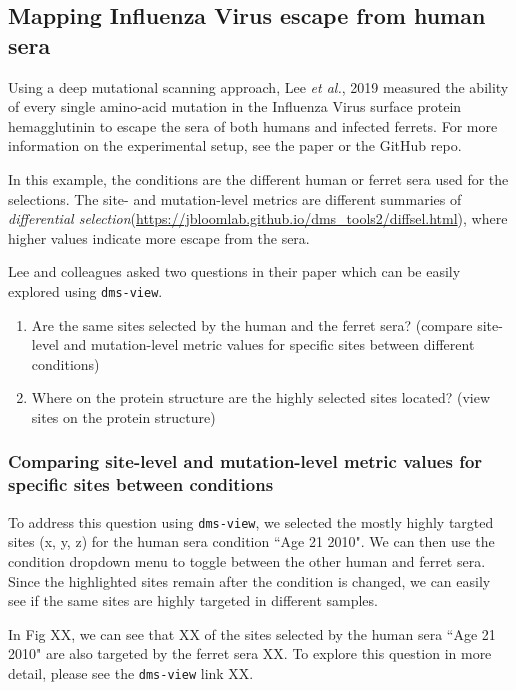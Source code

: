 \subsection{Mapping Influenza Virus escape from human sera}

Using a deep mutational scanning approach, Lee \textit{et al.}, 2019 measured the ability of every single amino-acid mutation in the Influenza Virus surface protein hemagglutinin to escape the sera of both humans and infected ferrets.
For more information on the experimental setup, see the paper or the GitHub repo.

In this example, the conditions are the different human or ferret sera used for the selections.
The site- and mutation-level metrics are different summaries of \textit{differential selection}(\url{https://jbloomlab.github.io/dms_tools2/diffsel.html}), where higher values indicate more escape from the sera.

Lee and colleagues asked two questions in their paper which can be easily explored using \texttt{dms-view}.

\begin{enumerate}
  \item Are the same sites selected by the human and the ferret sera? (compare site-level and mutation-level metric values for specific sites between different conditions)
  \item Where on the protein structure are the highly selected sites located? (view sites on the protein structure)
\end{enumerate}

\subsubsection{Comparing site-level and mutation-level metric values for specific sites between conditions}

To address this question using \texttt{dms-view}, we selected the mostly highly targted sites (x, y, z) for the human sera condition ``Age 21 2010".
We can then use the condition dropdown menu to toggle between the other human and ferret sera.
Since the highlighted sites remain after the condition is changed, we can easily see if the same sites are highly targeted in different samples.

In Fig XX, we can see that XX of the sites selected by the human sera ``Age 21 2010" are also targeted by the ferret sera XX.
To explore this question in more detail, please see the \texttt{dms-view} link XX.

